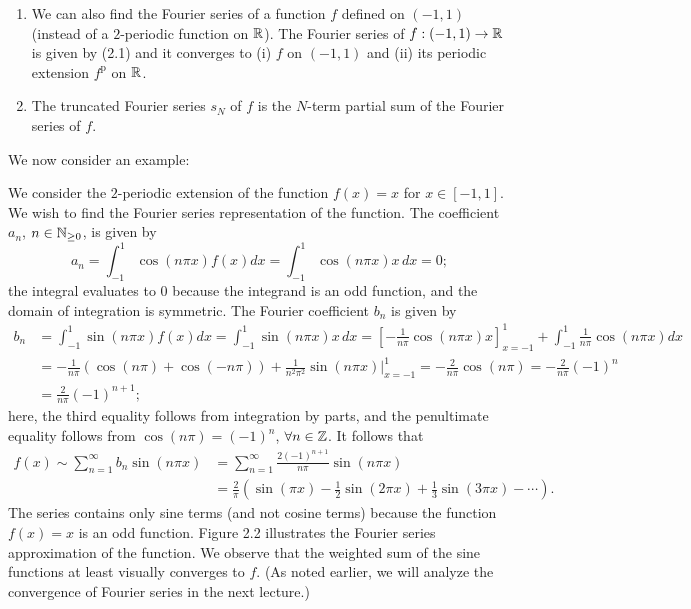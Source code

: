 \begin{enumerate}
    All integrals with the exception of the one multiplied by $a_2$ vanish due to the mutual orthogonality of the sine and cosine functions. We obtain the expression for all other $a_n$ and $b_n$ using the same orthogonality argument.
    \item We can also find the Fourier series of a function $f$ defined on $(-1, 1)$ (instead of a $2$-periodic function on $\mathbb{R}$). The Fourier series of $f : (-1, 1) \to \mathbb{R}$ is given by (2.1) and it converges to (i) $f$ on $(-1, 1)$ and (ii) its periodic extension $f^{\mathrm{p}}$ on $\mathbb{R}$.
    \item The truncated Fourier series $s_N$ of $f$ is the $N$-term partial sum of the Fourier series of $f$.
\end{enumerate}

We now consider an example:

\begin{example}[The Fourier Series of $f(x) = x$ on $(-1, 1)$][2.14]
    We consider the $2$-periodic extension of the function $f(x) = x$ for $x \in [-1, 1]$. We wish to find the Fourier series representation of the function. The coefficient $a_n$, $n \in \mathbb{N}_{\geq 0}$, is given by
    \[a_n = \int_{-1}^{1} \cos(n\pi x) f(x) dx = \int_{-1}^{1} \cos(n\pi x) x\,dx = 0;\]
    the integral evaluates to $0$ because the integrand is an odd function, and the domain of integration is symmetric. The Fourier coefficient $b_n$ is given by
    \begin{align*}
        b_n &= \int_{-1}^{1} \sin(n\pi x) f(x) dx = \int_{-1}^{1} \sin(n\pi x) x\,dx = \left[-\frac{1}{n\pi} \cos(n\pi x) x\right]_{x=-1}^{1} + \int_{-1}^{1} \frac{1}{n\pi} \cos(n\pi x) dx \\
        &= -\frac{1}{n\pi} \left(\cos(n\pi) + \cos(-n\pi)\right) + \frac{1}{n^2\pi^2} \sin(n\pi x) \Big|_{x=-1}^{1} = -\frac{2}{n\pi} \cos(n\pi) = -\frac{2}{n\pi} (-1)^n \\
        &= \frac{2}{n\pi} (-1)^{n+1};
    \end{align*}
    here, the third equality follows from integration by parts, and the penultimate equality follows from $\cos(n\pi) = (-1)^n$, $\forall n \in \mathbb{Z}$. It follows that
    \begin{align*}
        f(x) \sim \sum_{n=1}^{\infty} b_n \sin(n\pi x) &= \sum_{n=1}^{\infty} \frac{2(-1)^{n+1}}{n\pi} \sin(n\pi x) \\
        &= \frac{2}{\pi} \left(\sin(\pi x) - \frac{1}{2} \sin(2\pi x) + \frac{1}{3} \sin(3\pi x) - \cdots\right).
    \end{align*}
    The series contains only sine terms (and not cosine terms) because the function $f(x) = x$ is an odd function. Figure 2.2 illustrates the Fourier series approximation of the function. We observe that the weighted sum of the sine functions at least visually converges to $f$. (As noted earlier, we will analyze the convergence of Fourier series in the next lecture.)
\end{example}

